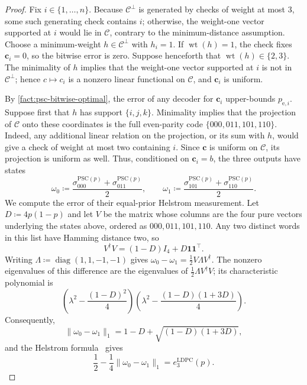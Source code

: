 \documentclass[11pt]{article}
\theoremstyle{remark}
\newcommand{\cC}{\mathcal{C}}
\newcommand{\wt}{\operatorname{wt}}
\newcommand{\one}{\mathbf{1}}
\newcommand{\bc}{\mathbf{c}}
\newcommand{\norm}[1]{\lVert#1\rVert}
\newcommand{\PSC}{\mathrm{PSC}}
\begin{document}
\begin{proof}
Fix $i \in \{1, \ldots , n\}$. Because $\cC^\perp$ is generated by checks of weight at most $3$, some such generating check contains $i$; otherwise, the weight-one vector supported at $i$ would lie in $\cC$, contrary to the minimum-distance assumption. Choose a minimum-weight $h \in \cC^\perp$ with $h_i = 1$. If $\wt(h) = 1$, the check fixes $\bc_i = 0$, so the bitwise error is zero. Suppose henceforth that $\wt(h) \in \{2,3\}$. The minimality of $h$ implies that the weight-one vector supported at $i$ is not in $\cC^\perp$; hence $c \mapsto c_i$ is a nonzero linear functional on $\cC$, and $\bc_i$ is uniform.

By \cref{fact:psc-bitwise-optimal}, the error of any decoder for $\bc_i$ upper-bounds $p_{\mathrm{e},i}$. Suppose first that $h$ has support $\{i,j,k\}$. Minimality implies that the projection of $\cC$ onto these coordinates is the full even-parity code $\{000,011,101,110\}$. Indeed, any additional linear relation on the projection, or its sum with $h$, would give a check of weight at most two containing $i$. Since $\bc$ is uniform on $\cC$, its projection is uniform as well. Thus, conditioned on $\bc_i = b$, the three outputs have states
\begin{equation*}
\omega_0
\coloneqq
\frac{\sigma_{000}^{\PSC(p)}+\sigma_{011}^{\PSC(p)}}{2},
\qquad
\omega_1
\coloneqq
\frac{\sigma_{101}^{\PSC(p)}+\sigma_{110}^{\PSC(p)}}{2}.
\end{equation*}
We compute the error of their equal-prior Helstrom measurement. Let $D \coloneqq 4p(1-p)$ and let $V$ be the matrix whose columns are the four pure vectors underlying the states above, ordered as $000,011,101,110$. Any two distinct words in this list have Hamming distance two, so
\begin{equation*}
V^\dagger V = (1-D)I_4+D\one\one^\top.
\end{equation*}
Writing $\Lambda \coloneqq \operatorname{diag}(1,1,-1,-1)$ gives $\omega_0-\omega_1 = \frac{1}{2}V\Lambda V^\dagger$. The nonzero eigenvalues of this difference are the eigenvalues of $\frac{1}{2}\Lambda V^\dagger V$; its characteristic polynomial is
\begin{equation*}
\left(\lambda^2-\frac{(1-D)^2}{4}\right)
\left(\lambda^2-\frac{(1-D)(1+3D)}{4}\right).
\end{equation*}
Consequently,
\begin{equation*}
\norm{\omega_0-\omega_1}_1
=1-D+\sqrt{(1-D)(1+3D)},
\end{equation*}
and the Helstrom formula~\cite[Theorem 3.2]{Wri24} gives
\begin{equation*}
\frac{1}{2}-\frac{1}{4}\norm{\omega_0-\omega_1}_1
=e_3^{\mathrm{LDPC}}(p).
\end{equation*}


\end{proof}
\end{document}
